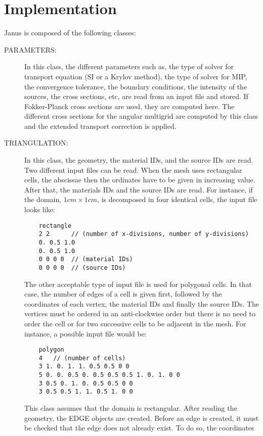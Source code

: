 \section{Implementation}
Janus is composed of the following classes:
\begin{description}
  \item[PARAMETERS:] In this class, the different parameters such as, the 
    type of solver for transport equation (SI or a Krylov method), the type 
    of solver for MIP, the convergence tolerance, the boundary conditions, 
    the intensity of the sources, the cross sections, etc, are read from an
    input file and stored. If Fokker-Planck cross sections are used, they 
    are computed here. The different cross sections for the angular
    multigrid are computed by this class and the extended transport correction 
    is applied.
  \item[TRIANGULATION:] In this class, the geometry, the material IDs, and the
    source IDs are read. Two different input files can be read. When the mesh
    uses rectangular cells, the abscissae then the ordinates have to be given 
    in increasing value. After that, the materials IDs and the source IDs are
    read. For instance, if the domain, $1cm \times 1cm$, is decomposed 
    in four identical cells, the input file looks like:
    \begin{verbatim}
    rectangle
    2 2      // (number of x-divisions, number of y-divisions)
    0. 0.5 1.0
    0. 0.5 1.0
    0 0 0 0  // (material IDs)
    0 0 0 0  // (source IDs)
    \end{verbatim}
    The other acceptable type of input file is used for polygonal cells. In 
    that case, the number of edges of a cell is given first, followed by the 
    coordinates of each vertex, the material IDs and finally the source IDs.
    The vertices must be ordered in an anti-clockwise order but there is no need
    to order the cell or for two successive cells to be adjacent in the mesh. 
    For instance, a possible input file would be:
    \begin{verbatim}
    polygon
    4   // (number of cells)
    3 1. 0. 1. 1. 0.5 0.5 0 0
    5 0. 0. 0.5 0. 0.5 0.5 0.5 1. 0. 1. 0 0
    3 0.5 0. 1. 0. 0.5 0.5 0 0
    3 0.5 0.5 1. 1. 0.5 1. 0 0
    \end{verbatim}
    This class assumes that the domain is rectangular. After reading the
    geometry, the EDGE objects are created. Before an edge is created, it must
    be checked that the edge does not already exist. To do so, the coordinates

\end{description}
